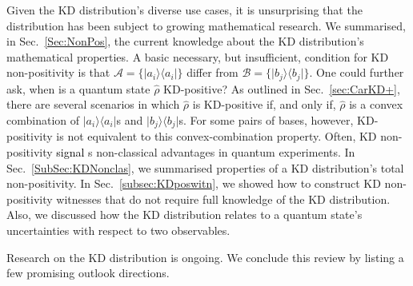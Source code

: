 \documentclass[%
 reprint,
superscriptaddress,
nofootinbib,
bibnotes,
 amsmath,amssymb,
 aps,
]{revtex4-1}
\theoremstyle{plain}
\newcommand*{\ketbra}[2]{\lvert #1 \rangle\!\langle #2 \rvert}
\newcommand{\Dave}[1]{\textcolor{black}{#1} }
\newcommand{\Acal}{{\mathcal A}}
\newcommand{\Bcal}{{\mathcal B}}
\begin{document}
Given the KD distribution's diverse use cases, it is unsurprising that the distribution has been subject to growing mathematical research. We summarised, in Sec.~\ref{Sec:NonPos}, the current knowledge about the KD distribution’s mathematical properties. A basic necessary, but insufficient, condition for KD non-positivity is that $ \Acal=\{ \ketbra{a_i}{a_i} \}  $  differ from $ \Bcal=\{ \ketbra{b_j}{b_j} \} $. One could further ask, when is a quantum state $\hat{\rho}$ KD-positive? As outlined in Sec.~\ref{sec:CarKD+}, 
there are several scenarios in which $\hat{\rho}$ is KD-positive 
if, and only if, $\hat{\rho}$ is a convex combination of $\ketbra{a_i}{a_i}$s and $\ketbra{b_j}{b_j}$s.
For some pairs of bases, however, KD-positivity is not equivalent to this convex-combination property. 
Often, KD non-positivity \Dave{signal}s non-classical advantages in quantum experiments. In Sec.~\ref{SubSec:KDNonclas}, we summarised properties of a KD distribution's total non-positivity. In Sec.~\ref{subsec:KDposwitn}, we showed how to construct KD non-positivity witnesses that do not require full knowledge of the KD distribution. Also, we discussed how the KD distribution relates to a quantum state's uncertainties with respect to two observables.

Research on the KD distribution is ongoing. We conclude this review by listing a few promising outlook directions. 
\end{document}
